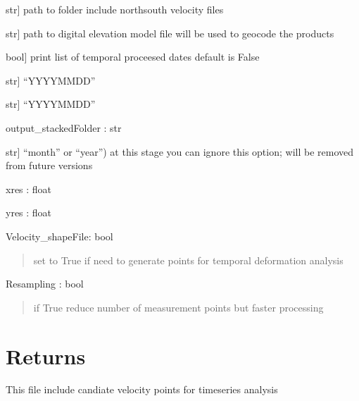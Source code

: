 \documentclass[letterpaper,10pt]{sphinxmanual}
\begin{document}
\begin{fulllineitems}
\begin{description}
\sphinxlineitem{path\_toFlowynFolder}{[}str{]}
\sphinxAtStartPar
path to folder include north\sphinxhyphen{}south velocity files

\sphinxlineitem{dem}{[}str{]}
\sphinxAtStartPar
path to digital elevation model file will be used to geocode the products

\sphinxlineitem{print\_list}{[}bool{]}
\sphinxAtStartPar
print list of temporal proceesed dates default is False

\sphinxlineitem{start\_date}{[}str{]}
\sphinxAtStartPar
“YYYYMMDD”

\sphinxlineitem{end\_date}{[}str{]}
\sphinxAtStartPar
“YYYYMMDD”

\end{description}

\sphinxAtStartPar
output\_stackedFolder : str
\begin{description}
\sphinxlineitem{VEL\_scale}{[}str{]}
\sphinxAtStartPar
“month” or “year”) at this stage you can ignore this option; will be removed from future versions

\end{description}

\sphinxAtStartPar
xres : float

\sphinxAtStartPar
yres : float

\sphinxAtStartPar
Velocity\_shapeFile: bool
\begin{quote}

\sphinxAtStartPar
set to True if need to generate points for temporal deformation analysis
\end{quote}

\sphinxAtStartPar
Resampling : bool
\begin{quote}

\sphinxAtStartPar
if True reduce number of measurement points but faster processing
\end{quote}


\section{Returns}
\label{\detokenize{generated/akhdefo_functions.stackprep:returns}}\begin{description}
\sphinxAtStartPar
This file include candiate velocity points for timeseries analysis

\end{description}

\end{fulllineitems}
\end{document}
